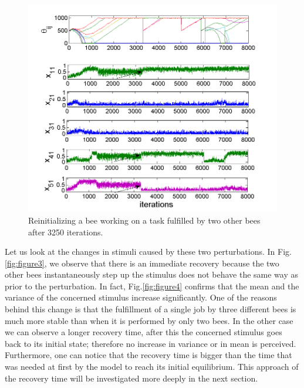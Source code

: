 \begin{center}
\begin{figure}[ht!]
\centering{}\includegraphics[scale=0.6]{figures/Figure2.png}\caption{Reinitializing a bee working on a task fulfilled by two other bees after 3250 iterations.}
\label{fig:figure2}
\end{figure}

\par\end{center}

Let us look at the changes in stimuli caused by these two perturbations. In Fig.\ref{fig:figure3}, we observe that there is an immediate recovery because the two other bees instantaneously step up the stimulus does not behave the same way as prior to the perturbation.
In fact, Fig.\ref{fig:figure4} confirms that the mean and the variance of the concerned stimulus increase significantly. One of the reasons behind this change is that the fulfillment of a single job by three different bees is much more stable than when it is performed by only two bees. In the other case we can observe a longer recovery time, after this the concerned stimulus goes back to its initial state; therefore no increase in variance or in mean is perceived. Furthermore, one can notice that the recovery time is bigger than the time that was needed at first by the model to reach its initial equilibrium. This approach of the recovery time will be investigated more deeply in the next section.


